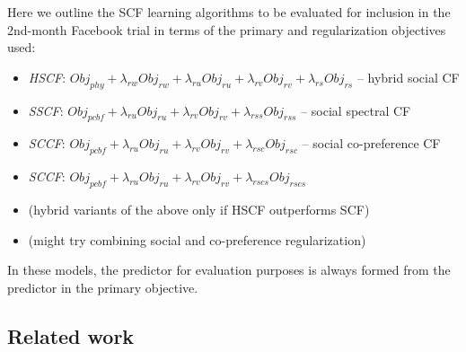 \documentclass{sig-alternate}
\newcommand{\Obj}{\mathit{Obj}}
\newcommand{\pcbf}{\mathit{pcbf}}
\newcommand{\phy}{\mathit{phy}}
\newcommand{\ru}{\mathit{ru}}
\newcommand{\rv}{\mathit{rv}}
\newcommand{\rw}{\mathit{rw}}
\newcommand{\rs}{\mathit{rs}}
\newcommand{\rss}{\mathit{rss}}
\newcommand{\rsc}{\mathit{rsc}}
\newcommand{\rscs}{\mathit{rscs}}
\begin{document}
Here we outline the SCF learning algorithms to be evaluated for inclusion
in the 2nd-month Facebook trial in terms of
the primary and regularization objectives used:
\begin{itemize}
\item {\it HSCF}: $\Obj_\phy + \lambda_\rw \Obj_\rw + \lambda_\ru \Obj_\ru + \lambda_\rv \Obj_\rv + \lambda_\rs \Obj_\rs$ -- hybrid social CF
\item {\it SSCF}: $\Obj_\pcbf + \lambda_\ru \Obj_\ru + \lambda_\rv \Obj_\rv + \lambda_\rss \Obj_\rss$ -- social spectral CF
\item {\it SCCF}: $\Obj_\pcbf + \lambda_\ru \Obj_\ru + \lambda_\rv \Obj_\rv + \lambda_\rsc \Obj_\rsc$ -- social co-preference CF
\item {\it SCCF}: $\Obj_\pcbf + \lambda_\ru \Obj_\ru + \lambda_\rv \Obj_\rv + \lambda_\rscs \Obj_\rscs$
\item (hybrid variants of the above only if HSCF outperforms SCF)
\item (might try combining social and co-preference regularization)
\end{itemize}
In these models, the predictor for evaluation purposes is always
formed from the predictor in the primary objective.

\subsection{Related work}
\end{document}
